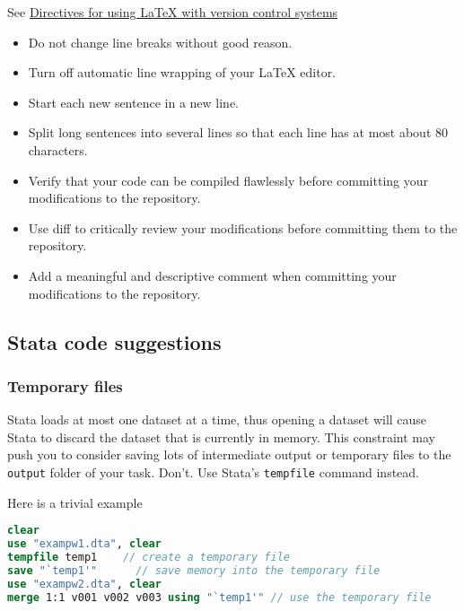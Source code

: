 See \href{https://en.wikibooks.org/wiki/LaTeX/Collaborative_Writing_of_LaTeX_Documents\#Subversion_really_makes_the_difference}{Directives for using LaTeX with version control systems}
\begin{itemize}
\item Do not change line breaks without good reason.
\item Turn off automatic line wrapping of your LaTeX editor.
\item Start each new sentence in a new line.
\item Split long sentences into several lines so that each line has at most about 80 characters.
\item Verify that your code can be compiled flawlessly before committing your modifications to the repository.
\item Use diff to critically review your modifications before committing them to the repository.
\item Add a meaningful and descriptive comment when committing your modifications to the repository.
\end{itemize}

\subsection{Stata code suggestions}

\subsubsection{Temporary files}
Stata loads at most one dataset at a time, 
thus opening a dataset will cause Stata to discard the dataset that is currently in memory.
This constraint may push you to consider saving lots of intermediate output or temporary files to the \texttt{output} folder of your task.
Don't.
Use Stata's \texttt{tempfile} command instead.

Here is a trivial example
\begin{lstlisting}[language=Stata]
clear
use "exampw1.dta", clear
tempfile temp1    // create a temporary file
save "`temp1'"      // save memory into the temporary file
use "exampw2.dta", clear
merge 1:1 v001 v002 v003 using "`temp1'" // use the temporary file
\end{lstlisting}
